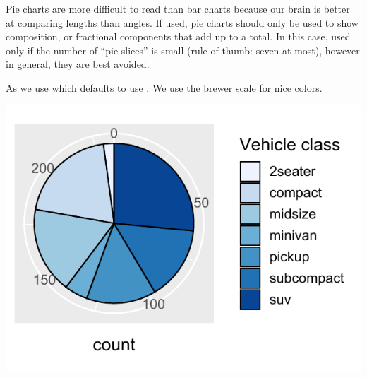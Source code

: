 \documentclass[krantz2]{krantz}\usepackage{knitr}
\begin{document}
\begin{warningbox}
Pie charts are more difficult to read than bar charts because our brain is better at comparing lengths than angles. If used, pie charts should only be used to show composition, or fractional components that add up to a total. In this case, used only if the number of “pie slices” is small (rule of thumb: seven at most), however in general, they are best avoided.
\end{warningbox}

As we use  which defaults to use . We use the brewer scale for nice colors.

\begin{knitrout}\footnotesize
{}\color{fgcolor}\begin{kframe}
\begin{alltt}
\hlstd{(}  \hlstd{(} \hlstd{=} \hlstd{(}\hlstd{),}  \hlstd{=}  \hlopt{+}
  \hlstd{(} \hlstd{=} \hlstd{,}  \hlstd{=} \hlstd{)} \hlopt{+}
  \hlstd{(} \hlstd{=} \hlstd{)} \hlopt{+}
  \hlstd{()} \hlopt{+}
  \hlstd{(} \hlstd{=} \hlstd{)} \hlopt{+}
  \hlstd{(} \hlstd{=} \hlstd{,}  \hlstd{=} \hlstd{)}
\end{alltt}
\end{kframe}

{\centering \includegraphics[width=.54\textwidth]{figure/pos-main-chunk-54-1} 

}



\end{knitrout}
\end{document}
